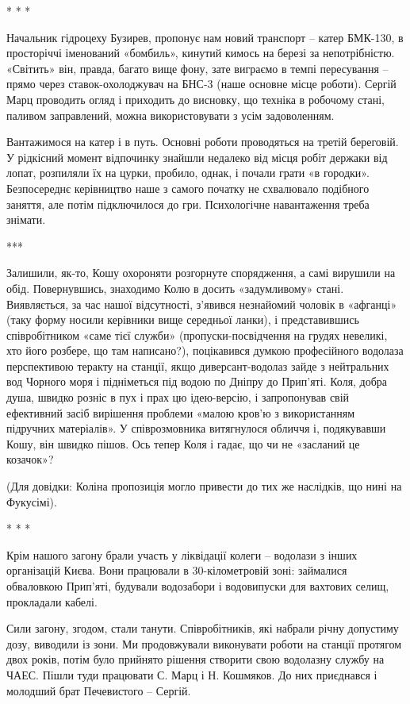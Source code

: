 * * *

Начальник гідроцеху Бузирев, пропонує нам новий транспорт – катер БМК-130, в
просторіччі іменований «бомбиль», кинутий кимось на березі за непотрібністю.
«Світить» він, правда, багато вище фону, зате виграємо в темпі пересування –
прямо через ставок-охолоджувач на БНС-3 (наше основне місце роботи). Сергій
Марц проводить огляд і приходить до висновку, що техніка в робочому стані,
паливом заправлений, можна використовувати з усім задоволенням.

Вантажимося на катер і в путь. Основні роботи проводяться на третій береговій.
У рідкісний момент відпочинку знайшли недалеко від місця робіт держаки від
лопат, розпиляли їх на цурки, пробило, однак, і почали грати «в городки».
Безпосереднє керівництво наше з самого початку не схвалювало подібного заняття,
але потім підключилося до гри. Психологічне навантаження треба знімати.

***

Залишили, як-то, Кошу охороняти розгорнуте спорядження, а самі вирушили на
обід. Повернувшись, знаходимо Колю в досить «задумливому» стані. Виявляється,
за час нашої відсутності, з'явився незнайомий чоловік в «афганці» (таку форму
носили керівники вище середньої ланки), і представившись співробітником «саме
тієї служби» (пропуски-посвідчення на грудях невеликі, хто його розбере, що там
написано?), поцікавився думкою професійного водолаза перспективою теракту на
станції, якщо диверсант-водолаз зайде з нейтральних вод Чорного моря і
підніметься під водою по Дніпру до Прип'яті. Коля, добра душа, швидко розніс в
пух і прах цю ідею-версію, і запропонував свій ефективний засіб вирішення
проблеми «малою кров'ю з використанням підручних матеріалів». У співрозмовника
витягнулося обличчя і, подякувавши Кошу, він швидко пішов. Ось тепер Коля і
гадає, що чи не «засланий це козачок»? 

(Для довідки: Коліна пропозиція могло привести до тих же наслідків, що нині на
Фукусімі).

* * *

Крім нашого загону брали участь у ліквідації колеги – водолази з інших
організацій Києва. Вони працювали в 30-кілометровій зоні: займалися обваловкою
Прип'яті, будували водозабори і водовипуски для вахтових селищ, прокладали
кабелі.

Сили загону, згодом, стали танути. Співробітників, які набрали річну допустиму
дозу, виводили із зони. Ми продовжували виконувати роботи на станції протягом
двох років, потім було прийнято рішення створити свою водолазну службу на ЧАЕС.
Пішли туди працювати С. Марц і Н. Кошмяков. До них приєднався і молодший брат
Печевистого – Сергій.

